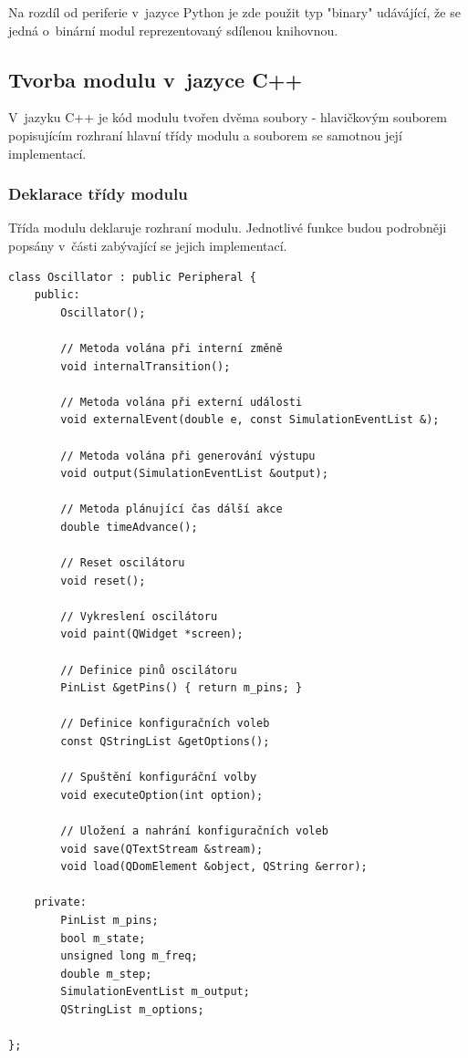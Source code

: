 Na rozdíl od periferie v~jazyce Python je zde použit typ "binary" udávájící, že se jedná o~binární modul reprezentovaný sdílenou knihovnou.

\subsection{Tvorba modulu v~jazyce C++}

V~jazyku C++ je kód modulu tvořen dvěma soubory - hlavičkovým souborem popisujícím rozhraní hlavní třídy modulu a souborem se samotnou její implementací.

\subsubsection{Deklarace třídy modulu}

Třída modulu deklaruje rozhraní modulu. Jednotlivé funkce budou podrobněji popsány v~části zabývající se jejich implementací.

\begin{lstlisting}
class Oscillator : public Peripheral {
	public:
		Oscillator();

		// Metoda volána při interní změně
		void internalTransition();

		// Metoda volána při externí události
		void externalEvent(double e, const SimulationEventList &);

		// Metoda volána při generování výstupu
		void output(SimulationEventList &output);

		// Metoda plánující čas dálší akce
		double timeAdvance();

		// Reset oscilátoru
		void reset();

		// Vykreslení oscilátoru
		void paint(QWidget *screen);

		// Definice pinů oscilátoru
		PinList &getPins() { return m_pins; }

		// Definice konfiguračních voleb
		const QStringList &getOptions();

		// Spuštění konfiguráční volby
		void executeOption(int option);

		// Uložení a nahrání konfiguračních voleb
		void save(QTextStream &stream);
		void load(QDomElement &object, QString &error);

	private:
		PinList m_pins;
		bool m_state;
		unsigned long m_freq;
		double m_step;
		SimulationEventList m_output;
		QStringList m_options;

};
\end{lstlisting}

